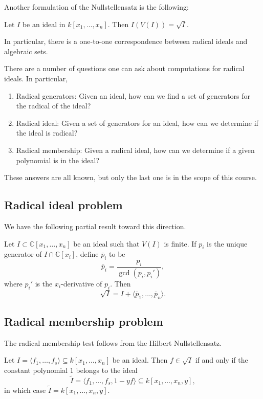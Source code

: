 \documentclass[12pt]{article}
\newcounter{problem}
\begin{document}
Another formulation of the Nullstellensatz is the following:
\begin{theorem}[Nullstellensatz]
	Let $I$ be an ideal in $k[x_1, \ldots, x_n]$. Then $I(V(I)) = \sqrt{I}$.
\end{theorem}
In particular, there is a one-to-one correspondence between radical ideals and algebraic sets.

\begin{remark}
	There are a number of questions one can ask about computations for radical ideals. In particular, \begin{enumerate}
		\item Radical generators: Given an ideal, how can we find a set of generators for the radical of the ideal?
		\item Radical ideal: Given a set of generators for an ideal, how can we determine if the ideal is radical?
		\item Radical membership: Given a radical ideal, how can we determine if a given polynomial is in the ideal?
	\end{enumerate}
	These answers are all known, but only the last one is in the scope of this course.
\end{remark}

\subsection{Radical ideal problem}
We have the following partial result toward this direction.
\begin{lemma}
	Let \(I \subset \mathbb{C}[x_1, \ldots, x_n]\) be an ideal such that \(V(I)\) is finite. If \(p_i\) is the unique generator of \(I \cap \mathbb{C}[x_i]\), define \(\overline{p}_i\) to be
	\[
		\overline{p}_i = \frac{p_i}{\gcd(p_i, p_i')},
	\]
	where \(p_i'\) is the \(x_i\)-derivative of \(p_i\). Then
	\[
		\sqrt{I} = I + \langle \overline{p}_1, \ldots, \overline{p}_n \rangle.
	\]
\end{lemma}

\subsection{Radical membership problem}
The radical membership test follows from the Hilbert Nullstellensatz.
\begin{proposition}
	Let $I = \langle f_1, \ldots, f_s \rangle \subseteq k[x_1, \ldots, x_n]$ be an ideal. Then $f \in \sqrt{I}$ if and only if the constant polynomial $1$ belongs to the ideal
	\[
		\tilde{I} = \langle f_1, \ldots, f_s, 1 - yf \rangle \subseteq k[x_1, \ldots, x_n, y],
	\]
	in which case $\tilde{I} = k[x_1, \ldots, x_n, y]$.
\end{proposition}
\end{document}
